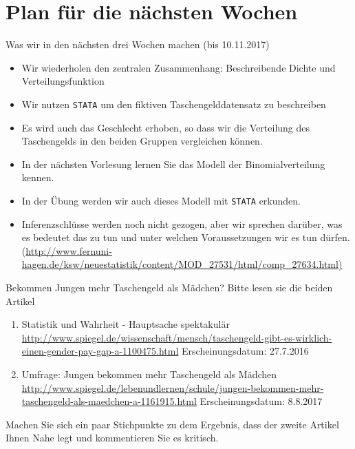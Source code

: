 \documentclass[usenames,dvipsnames,handout]{beamer}
\begin{document}
\section{Plan für die nächsten Wochen}
\begin{frame}{Was wir in den nächsten drei Wochen machen (bis 10.11.2017)}
\begin{itemize}
\item{Wir wiederholen den zentralen Zusammenhang: Beschreibende Dichte und Verteilungsfunktion}
\item{Wir nutzen \texttt{STATA} um den fiktiven Taschengelddatensatz zu beschreiben}
\item{Es wird auch das Geschlecht erhoben, so dass wir die Verteilung des
Taschengelds in den beiden Gruppen vergleichen können.}
\item{In der nächsten Vorlesung lernen Sie das Modell der Binomialverteilung kennen.}
\item{In der Übung werden wir auch dieses Modell mit \texttt{STATA} erkunden.}
\item{Inferenzschlüsse werden noch nicht gezogen, aber wir sprechen darüber,
was es bedeutet das zu tun und unter welchen Voraussetzungen wir es tun dürfen.
(\url{http://www.fernuni-hagen.de/ksw/neuestatistik/content/MOD_27531/html/comp_27634.html)}
}
\end{itemize}
\end{frame}

\begin{frame}{Bekommen Jungen mehr Taschengeld als Mädchen?}
Bitte lesen sie die beiden Artikel 
\begin{enumerate}
\item{ \colorbox{yellow!20}{Statistik und Wahrheit - Hauptsache spektakulär} \footnotesize{ \url{http://www.spiegel.de/wissenschaft/mensch/taschengeld-gibt-es-wirklich-einen-gender-pay-gap-a-1100475.html} } 
Erscheinungsdatum: 27.7.2016}
\item{ \colorbox{yellow!20}{ Umfrage: Jungen bekommen mehr Taschengeld als Mädchen} \footnotesize{ \url{http://www.spiegel.de/lebenundlernen/schule/jungen-bekommen-mehr-taschengeld-als-maedchen-a-1161915.html} }
Erscheinungsdatum:  8.8.2017}
\end{enumerate}
\colorbox{green!20}{Machen Sie sich ein paar Stichpunkte zu dem Ergebnis, }
\colorbox{green!20}{dass der zweite Artikel Ihnen Nahe legt und kommentieren Sie es kritisch.}
\end{frame}
\end{document}
